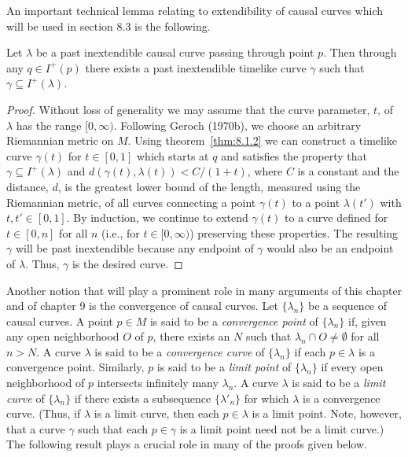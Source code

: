 An important technical lemma relating to extendibility of causal curves which will
be used in section 8.3 is the following.

\begin{lemma}\label{lem:8.1.4}
Let \(\lambda\) be a past inextendible causal curve passing through point \(p\).
Then through any \(q\in I^+(p)\) there exists a past inextendible timelike curve
\(\gamma\) such that \(\gamma\subseteq I^+(\lambda)\).
\end{lemma}
\begin{proof}
Without loss of generality we may assume that the curve parameter, \(t\), of
\(\lambda\) has the range \([0,\infty)\). Following Geroch (1970b), we choose an
arbitrary Riemannian metric on \(M\). Using theorem~\ref{thm:8.1.2} we can
construct a timelike curve \(\gamma(t)\) for \(t\in[0,1]\) which starts at \(q\) and
satisfies the property that \(\gamma\subseteq I^+(\lambda)\) and
\(d(\gamma(t),\lambda(t))<C/(1+t)\), where \(C\) is a constant and the distance,
\(d\), is the greatest lower bound of the length, measured using the Riemannian
metric, of all curves connecting a point \(\gamma(t)\) to a point \(\lambda(t')\) with
\(t,t'\in[0,1]\). By induction, we continue to extend \(\gamma(t)\) to a curve
defined for \(t\in[0,n]\) for all \(n\) (i.e., for \(t\in[0,\infty)\)) preserving
these properties. The resulting \(\gamma\) will be past inextendible because any
endpoint of \(\gamma\) would also be an endpoint of \(\lambda\). Thus, \(\gamma\) is
the desired curve.
\end{proof}

Another notion that will play a prominent role in many arguments of this chapter
and of chapter 9 is the convergence of causal curves. Let \(\{\lambda_n\}\) be a
sequence of causal curves. A point \(p\in M\) is said to be a \emph{convergence
point} of \(\{\lambda_n\}\) if, given any open neighborhood \(O\) of \(p\), there
exists an \(N\) such that \(\lambda_n\cap O\ne\emptyset\) for all \(n>N\). A curve
\(\lambda\) is said to be a \emph{convergence curve} of \(\{\lambda_n\}\) if each
\(p\in\lambda\) is a convergence point. Similarly, \(p\) is said to be a \emph{limit
point} of \(\{\lambda_n\}\) if every open neighborhood of \(p\) intersects infinitely
many \(\lambda_n\). A curve \(\lambda\) is said to be a \emph{limit curve} of
\(\{\lambda_n\}\) if there exists a subsequence \(\{\lambda'_n\}\) for which
\(\lambda\) is a convergence curve. (Thus, if \(\lambda\) is a limit curve, then each
\(p\in\lambda\) is a limit point. Note, however, that a curve \(\gamma\) such that
each \(p\in\gamma\) is a limit point need not be a limit curve.) The following result
plays a crucial role in many of the proofs given below.

